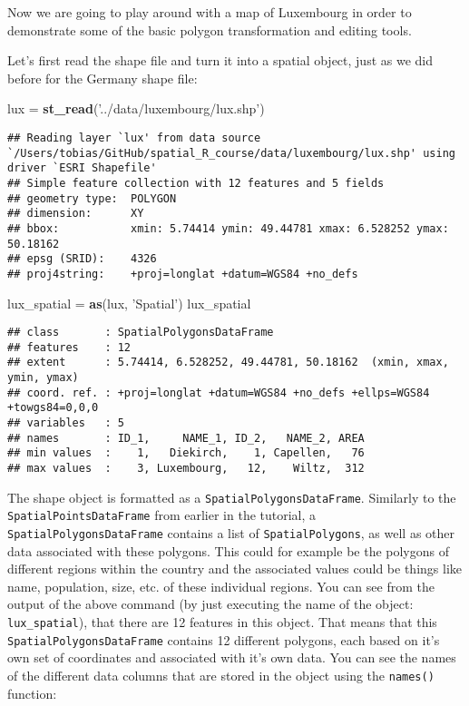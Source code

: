 \documentclass[]{article}
\newenvironment{Shaded}{\begin{snugshade}}{\end{snugshade}}
\newcommand{\KeywordTok}[1]{\textcolor[rgb]{0.13,0.29,0.53}{\textbf{#1}}}
\newcommand{\NormalTok}[1]{#1}
\newcommand{\StringTok}[1]{\textcolor[rgb]{0.31,0.60,0.02}{#1}}
\begin{document}
Now we are going to play around with a map of Luxembourg in order to
demonstrate some of the basic polygon transformation and editing tools.

Let's first read the shape file and turn it into a spatial object, just
as we did before for the Germany shape file:

\begin{Shaded}
\begin{Highlighting}[]
\NormalTok{lux =}\StringTok{ }\KeywordTok{st_read}\NormalTok{(}\StringTok{'../data/luxembourg/lux.shp'}\NormalTok{)}
\end{Highlighting}
\end{Shaded}

\begin{verbatim}
## Reading layer `lux' from data source `/Users/tobias/GitHub/spatial_R_course/data/luxembourg/lux.shp' using driver `ESRI Shapefile'
## Simple feature collection with 12 features and 5 fields
## geometry type:  POLYGON
## dimension:      XY
## bbox:           xmin: 5.74414 ymin: 49.44781 xmax: 6.528252 ymax: 50.18162
## epsg (SRID):    4326
## proj4string:    +proj=longlat +datum=WGS84 +no_defs
\end{verbatim}

\begin{Shaded}
\begin{Highlighting}[]
\NormalTok{lux_spatial =}\StringTok{ }\KeywordTok{as}\NormalTok{(lux, }\StringTok{'Spatial'}\NormalTok{)}
\NormalTok{lux_spatial}
\end{Highlighting}
\end{Shaded}

\begin{verbatim}
## class       : SpatialPolygonsDataFrame 
## features    : 12 
## extent      : 5.74414, 6.528252, 49.44781, 50.18162  (xmin, xmax, ymin, ymax)
## coord. ref. : +proj=longlat +datum=WGS84 +no_defs +ellps=WGS84 +towgs84=0,0,0 
## variables   : 5
## names       : ID_1,     NAME_1, ID_2,   NAME_2, AREA 
## min values  :    1,   Diekirch,    1, Capellen,   76 
## max values  :    3, Luxembourg,   12,    Wiltz,  312
\end{verbatim}

The shape object is formatted as a \texttt{SpatialPolygonsDataFrame}.
Similarly to the \texttt{SpatialPointsDataFrame} from earlier in the
tutorial, a \texttt{SpatialPolygonsDataFrame} contains a list of
\texttt{SpatialPolygons}, as well as other data associated with these
polygons. This could for example be the polygons of different regions
within the country and the associated values could be things like name,
population, size, etc. of these individual regions. You can see from the
output of the above command (by just executing the name of the object:
\texttt{lux\_spatial}), that there are 12 features in this object. That
means that this \texttt{SpatialPolygonsDataFrame} contains 12 different
polygons, each based on it's own set of coordinates and associated with
it's own data. You can see the names of the different data columns that
are stored in the object using the \texttt{names()} function:
\end{document}
